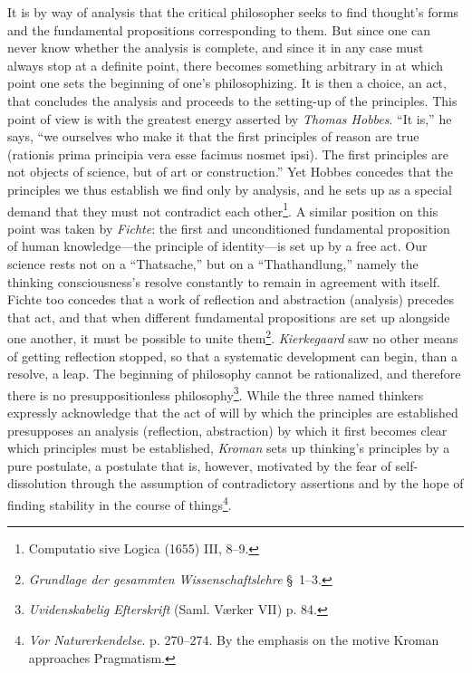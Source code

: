\documentclass[12pt,a4paper]{book}
\newcommand{\opage}[1]{\marginnote{\footnotesize\textit{[#1]}}}
\begin{document}
It is by way of analysis that the critical philosopher seeks to find thought's
forms and the fundamental propositions corresponding to them. But since one can
never know whether the analysis is complete, and since it in any case must
always stop at a definite point, there becomes something arbitrary in at which
point one sets the beginning of one's philosophizing. It is then a choice, an
act, that concludes the analysis and proceeds to the setting-up of the
principles. This point of view is with the greatest energy asserted by
\emph{Thomas Hobbes}. ``It is,'' he says, ``we ourselves who make it that the
first principles of reason are true (rationis prima principia vera esse facimus
nosmet ipsi). The first principles are not objects of science, but of art or
construction.'' Yet Hobbes concedes that the principles we thus establish we
find only by analysis, and he sets up as a special demand that they must not
contradict each other\footnote{Computatio sive Logica (1655) III, 8--9.}. A
similar position on this point was taken by \emph{Fichte}: the first and
unconditioned fundamental proposition of human knowledge---the principle of
identity---is set up by a free act. Our science rests not on a ``Thatsache,''
but on a ``Thathandlung,'' namely the \opage{268}thinking consciousness's resolve
constantly to remain in agreement with itself. Fichte too concedes that a work
of reflection and abstraction (analysis) precedes that act, and that when
different fundamental propositions are set up alongside one another, it must be
possible to unite them\footnote{\emph{Grundlage der gesammten
Wissenschaftslehre} \S\ 1--3.}. \emph{Kierkegaard} saw no other means of
getting reflection stopped, so that a systematic development can begin, than a
resolve, a leap. The beginning of philosophy cannot be rationalized, and
therefore there is no presuppositionless philosophy\footnote{\emph{Uvidenskabelig
Efterskrift} (Saml. Værker VII) p. 84.}. While the three named thinkers
expressly acknowledge that the act of will by which the principles are
established presupposes an analysis (reflection, abstraction) by which it first
becomes clear which principles must be established, \emph{Kroman} sets up
thinking's principles by a pure postulate, a postulate that is, however,
motivated by the fear of self-dissolution through the assumption of
contradictory assertions and by the hope of finding stability in the course of
things\footnote{\emph{Vor Naturerkendelse}. p. 270--274. By the emphasis on the
motive Kroman approaches Pragmatism.}.
\end{document}
